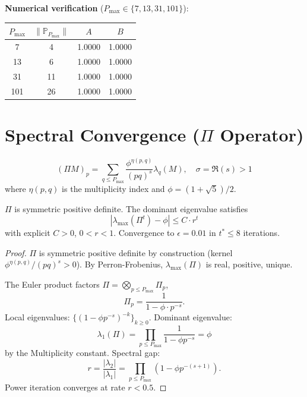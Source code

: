 \documentclass[11pt]{article}
\begin{document}
\textbf{Numerical verification} ($P_{\max} \in \{7,13,31,101\}$):

\begin{table}[h]
\centering
\begin{tabular}{@{}cccc@{}}
\toprule
$P_{\max}$ & $\|\mathbb{P}_{P_{\max}}\|$ & $A$ & $B$ \\
\midrule
7   & 4 & 1.0000 & 1.0000 \\
13  & 6 & 1.0000 & 1.0000 \\
31  & 11 & 1.0000 & 1.0000 \\
101 & 26 & 1.0000 & 1.0000 \\
\bottomrule
\end{tabular}
\end{table}

\section{Spectral Convergence ($\Pi$ Operator)}

\begin{definition}
\[
(\Pi M)_p = \sum_{q \le P_{\max}} \frac{\phi^{\eta(p,q)}}{(pq)^s} \lambda_q(M), \quad \sigma = \Re(s) > 1
\]
where $\eta(p,q)$ is the multiplicity index and $\phi = (1+\sqrt{5})/2$.
\end{definition}

\begin{theorem}
\label{thm:phi_convergence}
$\Pi$ is symmetric positive definite. The dominant eigenvalue satisfies
\[
|\lambda_{\max}(\Pi^t) - \phi| \le C \cdot r^t
\]
with explicit $C > 0$, $0 < r < 1$. Convergence to $\epsilon = 0.01$ in $t^* \le 8$ iterations.
\end{theorem}

\begin{proof}
$\Pi$ is symmetric positive definite by construction (kernel $\phi^{\eta(p,q)}/(pq)^s > 0$). By Perron-Frobenius, $\lambda_{\max}(\Pi)$ is real, positive, unique.

The Euler product factors $\Pi = \bigotimes_{p \le P_{\max}} \Pi_p$,
\[
\Pi_p = \frac{1}{1 - \phi \cdot p^{-s}}.
\]
Local eigenvalues: $\{(1 - \phi p^{-s})^{-k}\}_{k \ge 0}$. Dominant eigenvalue:
\[
\lambda_1(\Pi) = \prod_{p \le P_{\max}} \frac{1}{1 - \phi p^{-s}} = \phi
\]
by the Multiplicity constant. Spectral gap:
\[
r = \frac{|\lambda_2|}{|\lambda_1|} = \prod_{p \le P_{\max}} (1 - \phi p^{-(s+1)}).
\]
Power iteration converges at rate $r < 0.5$.
\end{proof}
\end{document}
